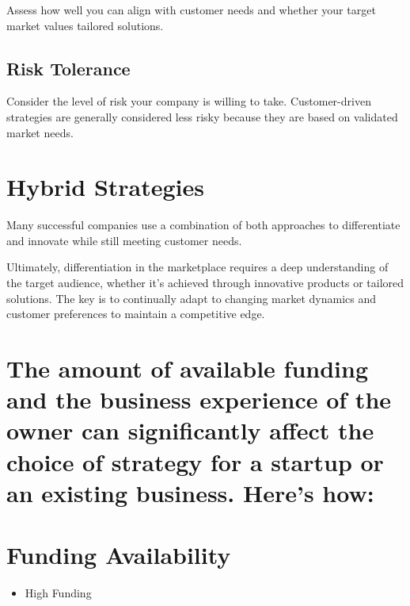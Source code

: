 \documentclass[
]{book}
\providecommand{\tightlist}{%
  \setlength{\itemsep}{0pt}\setlength{\parskip}{0pt}}
\begin{document}
Assess how well you can align with customer needs and whether your target market values tailored solutions.

\hypertarget{risk-tolerance}{%
\subsection{Risk Tolerance}\label{risk-tolerance}}

Consider the level of risk your company is willing to take. Customer-driven strategies are generally considered less risky because they are based on validated market needs.

\hypertarget{hybrid-strategies}{%
\section{Hybrid Strategies}\label{hybrid-strategies}}

Many successful companies use a combination of both approaches to differentiate and innovate while still meeting customer needs.

Ultimately, differentiation in the marketplace requires a deep understanding of the target audience, whether it's achieved through innovative products or tailored solutions. The key is to continually adapt to changing market dynamics and customer preferences to maintain a competitive edge.

\hypertarget{the-amount-of-available-funding-and-the-business-experience-of-the-owner-can-significantly-affect-the-choice-of-strategy-for-a-startup-or-an-existing-business.-heres-how}{%
\section{The amount of available funding and the business experience of the owner can significantly affect the choice of strategy for a startup or an existing business. Here's how:}\label{the-amount-of-available-funding-and-the-business-experience-of-the-owner-can-significantly-affect-the-choice-of-strategy-for-a-startup-or-an-existing-business.-heres-how}}

\hypertarget{funding-availability}{%
\section{Funding Availability}\label{funding-availability}}

\begin{itemize}
\tightlist
\item
  High Funding
\end{itemize}
\end{document}
